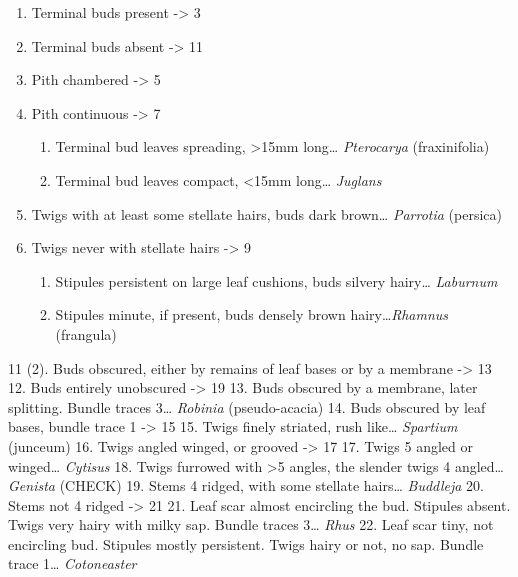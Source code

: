 \documentclass[openany]{book}
\providecommand{\tightlist}{%
  \setlength{\itemsep}{0pt}\setlength{\parskip}{0pt}}
\begin{document}
\begin{enumerate}
\def\labelenumi{\arabic{enumi}.}
\tightlist
\item
  Terminal buds present -\textgreater{} 3
\item
  Terminal buds absent -\textgreater{} 11
\item
  Pith chambered -\textgreater{} 5
\item
  Pith continuous -\textgreater{} 7

  \begin{enumerate}
  \def\labelenumii{\arabic{enumii}.}
  \setcounter{enumii}{4}
  \tightlist
  \item
    Terminal bud leaves spreading, \textgreater{}15mm long\ldots{}
    \emph{Pterocarya} (fraxinifolia)
  \item
    Terminal bud leaves compact, \textless{}15mm long\ldots{}
    \emph{Juglans}
  \end{enumerate}
\item
  Twigs with at least some stellate hairs, buds dark brown\ldots{}
  \emph{Parrotia} (persica)
\item
  Twigs never with stellate hairs -\textgreater{} 9

  \begin{enumerate}
  \def\labelenumii{\arabic{enumii}.}
  \setcounter{enumii}{8}
  \tightlist
  \item
    Stipules persistent on large leaf cushions, buds silvery
    hairy\ldots{} \emph{Laburnum}
  \item
    Stipules minute, if present, buds densely brown
    hairy\ldots{}\emph{Rhamnus} (frangula)
  \end{enumerate}
\end{enumerate}

11 (2). Buds obscured, either by remains of leaf bases or by a membrane
-\textgreater{} 13 12. Buds entirely unobscured -\textgreater{} 19 13.
Buds obscured by a membrane, later splitting. Bundle traces 3\ldots{}
\emph{Robinia} (pseudo-acacia) 14. Buds obscured by leaf bases, bundle
trace 1 -\textgreater{} 15 15. Twigs finely striated, rush like\ldots{}
\emph{Spartium} (junceum) 16. Twigs angled winged, or grooved
-\textgreater{} 17 17. Twigs 5 angled or winged\ldots{} \emph{Cytisus}
18. Twigs furrowed with \textgreater{}5 angles, the slender twigs 4
angled\ldots{} \emph{Genista} (CHECK) 19. Stems 4 ridged, with some
stellate hairs\ldots{} \emph{Buddleja} 20. Stems not 4 ridged
-\textgreater{} 21 21. Leaf scar almost encircling the bud. Stipules
absent. Twigs very hairy with milky sap. Bundle traces 3\ldots{}
\emph{Rhus} 22. Leaf scar tiny, not encircling bud. Stipules mostly
persistent. Twigs hairy or not, no sap. Bundle trace 1\ldots{}
\emph{Cotoneaster}
\end{document}
